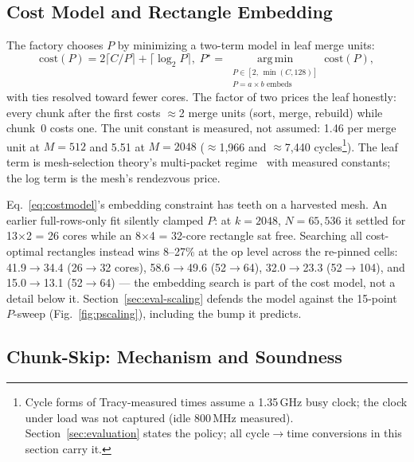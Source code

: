 \subsection{Cost Model and Rectangle Embedding}
\label{sec:costmodel}

The factory chooses $P$ by minimizing a two-term model in leaf merge
units:
\begin{equation}
  \mathrm{cost}(P) \!=\! 2\big\lceil C/P \big\rceil
  \!+\! \big\lceil \log_2 P \big\rceil,
  \;
  P^{\star} \!=\!\! \operatorname*{arg\,min}_{\substack{P \in [2,\,\min(C,128)]\\
  P = a \times b \text{ embeds}}} \!\! \mathrm{cost}(P),
  \label{eq:costmodel}
\end{equation}
with ties resolved toward fewer cores. The factor of two prices the leaf
honestly: every chunk after the first costs $\approx$2 merge units (sort,
merge, rebuild) while chunk~0 costs one. The unit constant is measured,
not assumed: 1.46\us{} per merge unit at $M{=}512$ and 5.51\us{} at
$M{=}2048$ ($\approx$1{,}966 and $\approx$7{,}440
cycles\footnote{\label{fn:clock}Cycle forms of Tracy-measured times assume
a 1.35\,GHz busy clock; the clock under load was not captured (idle
800\,MHz measured). Section~\ref{sec:evaluation} states the policy; all
cycle$\rightarrow$time conversions in this section carry it.}). The leaf
term is mesh-selection theory's multi-packet
regime~\cite{krizanc1992optimal,krizanc1993fast,multipacket1992} with
measured constants; the log term is the mesh's rendezvous price.

Eq.~\ref{eq:costmodel}'s embedding constraint has teeth on a harvested
mesh. An earlier full-rows-only fit silently clamped
$P$: at $k{=}2048$, $N{=}65{,}536$ it settled for 13$\times$2 = 26 cores
while an 8$\times$4 = 32-core rectangle sat free. Searching all
cost-optimal rectangles instead wins 8--27\% at the op level across the
re-pinned cells: 41.9$\rightarrow$34.4\us{} (26$\rightarrow$32 cores),
58.6$\rightarrow$49.6\us{} (52$\rightarrow$64), 32.0$\rightarrow$23.3\us{}
(52$\rightarrow$104), and 15.0$\rightarrow$13.1\us{}
(52$\rightarrow$64) --- the embedding search is part of the cost model,
not a detail below it.
Section~\ref{sec:eval-scaling} defends the model against the 15-point
$P$-sweep (Fig.~\ref{fig:pscaling}), including the bump it predicts.

\subsection{Chunk-Skip: Mechanism and Soundness}
\label{sec:skip-mech}

